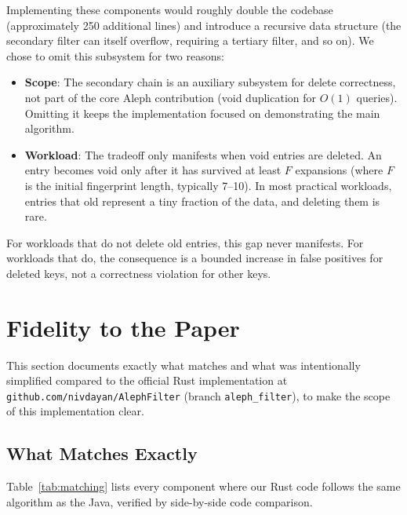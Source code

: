 Implementing these components would roughly double the codebase (approximately 250 additional lines) and introduce a recursive data structure (the secondary filter can itself overflow, requiring a tertiary filter, and so on). We chose to omit this subsystem for two reasons:

\begin{itemize}
    \item \textbf{Scope}: The secondary chain is an auxiliary subsystem for delete correctness, not part of the core Aleph contribution (void duplication for $O(1)$ queries). Omitting it keeps the implementation focused on demonstrating the main algorithm.
    \item \textbf{Workload}: The tradeoff only manifests when void entries are deleted. An entry becomes void only after it has survived at least $F$ expansions (where $F$ is the initial fingerprint length, typically 7--10). In most practical workloads, entries that old represent a tiny fraction of the data, and deleting them is rare.
\end{itemize}

For workloads that do not delete old entries, this gap never manifests. For workloads that do, the consequence is a bounded increase in false positives for deleted keys, not a correctness violation for other keys.

\section{Fidelity to the Paper}

This section documents exactly what matches and what was intentionally simplified compared to the official Rust implementation at \texttt{github.com/nivdayan/AlephFilter} (branch \texttt{aleph\_filter}), to make the scope of this implementation clear.

\subsection{What Matches Exactly}

Table~\ref{tab:matching} lists every component where our Rust code follows the same algorithm as the Java, verified by side-by-side code comparison.

